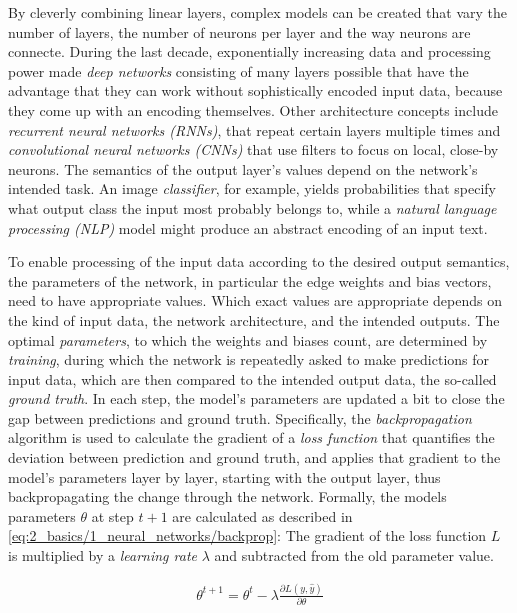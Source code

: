 By cleverly combining linear layers, complex models can be created that vary the number of layers, the number of neurons per layer and the way neurons are connecte. During the last decade, exponentially increasing data and processing power made \emph{deep networks} consisting of many layers possible that have the advantage that they can work without sophistically encoded input data, because they come up with an encoding themselves. Other architecture concepts include \emph{recurrent neural networks (RNNs)}, that repeat certain layers multiple times and \emph{convolutional neural networks (CNNs)} that use filters to focus on local, close-by neurons. The semantics of the output layer's values depend on the network's intended task. An image \emph{classifier}, for example, yields probabilities that specify what output class the input most probably belongs to, while a \emph{natural language processing (NLP)} model might produce an abstract encoding of an input text.

To enable processing of the input data according to the desired output semantics, the parameters of the network, in particular the edge weights and bias vectors, need to have appropriate values. Which exact values are appropriate depends on the kind of input data, the network architecture, and the intended outputs. The optimal \emph{parameters}, to which the weights and biases count, are determined by \emph{training}, during which the network is repeatedly asked to make predictions for input data, which are then compared to the intended output data, the so-called \emph{ground truth}. In each step, the model's parameters are updated a bit to close the gap between predictions and ground truth. Specifically, the \emph{backpropagation} algorithm is used to calculate the gradient of a \emph{loss function} that quantifies the deviation between prediction and ground truth, and applies that gradient to the model's parameters layer by layer, starting with the output layer, thus backpropagating the change through the network. Formally, the models parameters $\theta$ at step $t+1$ are calculated as described in \autoref{eq:2_basics/1_neural_networks/backprop}: The gradient of the loss function $L$ is multiplied by a \emph{learning rate} $\lambda$ and subtracted from the old parameter value.

\begin{align}
    \theta^{t+1} = \theta^t - \lambda \frac{\partial L(y, \hat{y})}{\partial \theta}
    \label{eq:2_basics/1_neural_networks/backprop}
\end{align}


